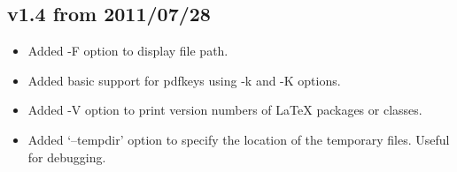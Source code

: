 \documentclass{article}
\begin{document}
\subsection*{v1.4 from 2011/07/28}
\begin{itemize}
 \item Added -F option to display file path.
 \item Added basic support for pdfkeys using -k and -K options.
 \item Added -V option to print version numbers of LaTeX packages or classes.
 \item Added `--tempdir' option to specify the location of the temporary files. Useful for debugging.
\end{itemize}
\end{document}
